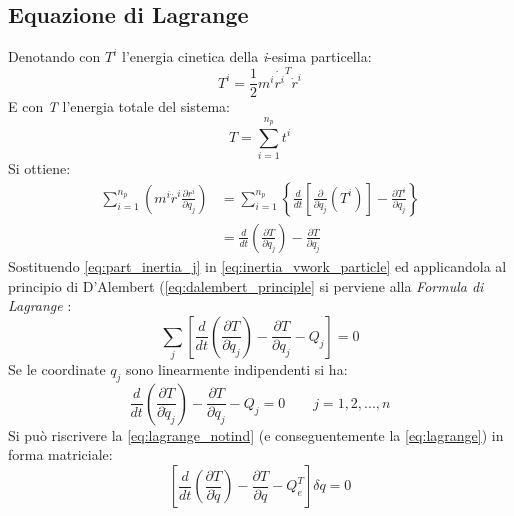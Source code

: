 \subsection{Equazione di Lagrange}
Denotando con $T^i$ l'energia cinetica della \emph{i}-esima particella:
\begin{equation}
\label{eq:part_kinenergy}
T^i = \frac{1}{2}m^i\dot{r^i}^T\dot{r}^i
\end{equation}
E con \emph{T} l'energia totale del sistema:
\[T = \sum_{i=1}^{n_p}t^i\]
Si ottiene:
\begin{align}
\label{eq:part_inertia_j}
\sum_{i=1}^{n_p} \left(m^i\ddot{r}^i\frac{\partial r^i}{\partial q_j}\right) 
&= \sum_{i=1}^{n_p}\left\{\frac{d}{dt}\left[\frac{\partial}{\partial\dot{q}_j}(T^i)\right] -\frac{\partial T^i}{\partial q_j} \right\} \\
&= \frac{d}{dt}\left(\frac{\partial T}{\partial\dot{q}_j}\right) - \frac{\partial T}{\partial q_j} 
\end{align}
Sostituendo \ref{eq:part_inertia_j} in \ref{eq:inertia_vwork_particle} ed applicandola al principio di D'Alembert (\ref{eq:dalembert_principle}
si perviene alla \emph{Formula di Lagrange} :
\begin{equation}
\label{eq:lagrange_notind}
\sum_j\left[ \frac{d}{dt}\left( \frac{\partial T}{\partial\dot{q}_j}\right) -\frac{\partial T}{\partial q_j} -Q_j \right] = 0
\end{equation}
Se le coordinate $q_j$ sono linearmente indipendenti si ha:
\begin{equation}
\label{eq:lagrange}
\frac{d}{dt}\left( \frac{\partial T}{\partial\dot{q}_j}\right) -\frac{\partial T}{\partial q_j} -Q_j = 0 \qquad j = 1, 2, ... ,n
\end{equation}
Si può riscrivere la \ref{eq:lagrange_notind} (e conseguentemente la \ref{eq:lagrange}) in forma matriciale:
\begin{equation} \label{eq:lagrange_matrix}
\left[ \frac{d}{dt} \left(\frac{\partial T}{\partial \dot{q}} \right) - \frac{\partial T}{\partial q} - Q_e^T \right] \delta q = 0
\end{equation}
%
